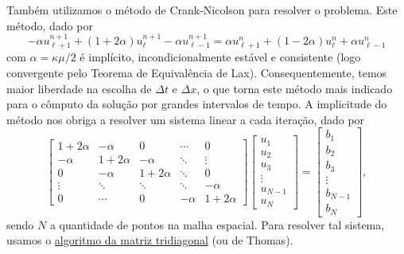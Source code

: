 \documentclass[twocolumn,showpacs,%
  nofootinbib,aps,superscriptaddress,%
  eqsecnum,prd,notitlepage,showkeys,10pt]{revtex4-1} %
\begin{document}
	Também utilizamos o método de Crank-Nicolson para resolver o problema.
	Este método, dado por
	\begin{equation}
		\label{eq:crank-nicolson}
		-\alpha u^{n+1}_{\ell + 1} + (1 + 2\alpha)u^{n+1}_{\ell} - \alpha u^{n+1}_{\ell - 1}
		= \alpha u^{n}_{\ell + 1} + (1 - 2\alpha)u^{n}_{\ell} + \alpha u^{n}_{\ell - 1}
	\end{equation}
	com $\alpha = \kappa\mu/2$ é implícito, incondicionalmente estável e consistente
	(logo convergente pelo Teorema de Equivalência de Lax).
	Consequentemente, temos maior liberdade na escolha de $\Delta t$ e $\Delta x$, o que torna
	este método mais indicado para o cômputo da solução por grandes intervalos de tempo.
	A implicitude do método nos obriga a resolver um sistema linear a cada iteração,
	dado por
	\begin{equation}
		\begin{bmatrix}
			1 + 2\alpha & -\alpha & 0 & \cdots & 0 \\
			-\alpha & 1 + 2\alpha & -\alpha & \ddots & \vdots \\
			0 & -\alpha & 1 + 2\alpha & \ddots & 0 \\
			\vdots & \ddots & \ddots & \ddots & -\alpha \\
			0 & \cdots & 0 & -\alpha & 1 + 2\alpha
		\end{bmatrix}
		\begin{bmatrix}
			u_1 \\
			u_2 \\
			u_3 \\
			\vdots \\
			u_{N-1} \\
			u_N
		\end{bmatrix}
		=
		\begin{bmatrix}
			b_1 \\
			b_2 \\
			b_3 \\
			\vdots \\
			b_{N-1} \\
			b_N
		\end{bmatrix},
	\end{equation}
	sendo $N$ a quantidade de pontos na malha espacial.
	Para resolver tal sistema, usamos o \href{https://en.wikipedia.org/wiki/Tridiagonal_matrix_algorithm}{algoritmo da matriz tridiagonal}
	(ou de Thomas).
%
\end{document}
